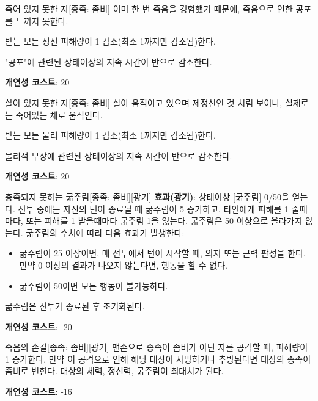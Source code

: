 \documentclass{report}
\begin{document}
	\begin{story}{죽어 있지 못한 자}{[종족: 좀비]}
		이미 한 번 죽음을 경험했기 때문에, 죽음으로 인한 공포를 느끼지 못한다.
		
		받는 모든 정신 피해량이 1 감소(최소 1까지만 감소됨)한다.
		
		"공포"에 관련된 상태이상의 지속 시간이 반으로 감소한다.
		
		\smallskip
		
		\textbf{개연성 코스트}: 20
	\end{story}
	
	\begin{story}{살아 있지 못한 자}{[종족: 좀비]}
		살아 움직이고 있으며 제정신인 것 처럼 보이나, 실제로는 죽어있는 채로 움직인다.
		
		받는 모든 물리 피해량이 1 감소(최소 1까지만 감소됨)한다.
		
		물리적 부상에 관련된 상태이상의 지속 시간이 반으로 감소한다.
		
		\smallskip
		
		\textbf{개연성 코스트}: 20
	\end{story}
	
	\begin{story}{충족되지 못하는 굶주림}{[종족: 좀비][광기]}
		\textbf{효과(광기)}: 상태이상 [굶주림] 0/50을 얻는다. 전투 중에는 자신의 턴이 종료될 때 굶주림이 5 증가하고, 타인에게 피해를 1 줄때마다, 또는 피해를 1 받을때마다 굶주림 1을 잃는다. 굶주림은 50 이상으로 올라가지 않는다. 굶주림의 수치에 따라 다음 효과가 발생한다:
		\begin{itemize}
			\item 굶주림이 25 이상이면, 매 전투에서 턴이 시작할 때, 의지 또는 근력 판정을 한다. 만약 0 이상의 결과가 나오지 않는다면, 행동을 할 수 없다.
			\item 굶주림이 50이면 모든 행동이 불가능하다.
		\end{itemize}
		굶주림은 전투가 종료된 후 초기화된다.
		
		\smallskip
		
		\textbf{개연성 코스트}: -20
	\end{story}
	
	\begin{story}{죽음의 손길}{[종족: 좀비][광기]}
		맨손으로 종족이 좀비가 아닌 자를 공격할 때, 피해량이 1 증가한다. 만약 이 공격으로 인해 해당 대상이 사망하거나 추방된다면 대상의 종족이 좀비로 변한다. 대상의 체력, 정신력, 굶주림이 최대치가 된다.
		
		\smallskip
		
		\textbf{개연성 코스트}: -16
	\end{story}
\end{document}
